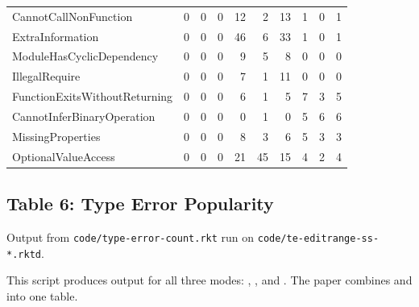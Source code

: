 \documentclass{article}
\begin{document}
\begin{tabular}{lr@{~}r@{~}rr@{~}r@{~}rr@{~}r@{~}r}
  CannotCallNonFunction & {0} & {0} & {0} & {12} & {2} & {13} & {1} & {0} & {1} \\
  ExtraInformation & {0} & {0} & {0} & {46} & {6} & {33} & {1} & {0} & {1} \\
  ModuleHasCyclicDependency & {0} & {0} & {0} & {9} & {5} & {8} & {0} & {0} & {0} \\
  IllegalRequire & {0} & {0} & {0} & {7} & {1} & {11} & {0} & {0} & {0} \\
  FunctionExitsWithoutReturning & {0} & {0} & {0} & {6} & {1} & {5} & {7} & {3} & {5} \\
  CannotInferBinaryOperation & {0} & {0} & {0} & {0} & {1} & {0} & {5} & {6} & {6} \\
  MissingProperties & {0} & {0} & {0} & {8} & {3} & {6} & {5} & {3} & {3} \\
  OptionalValueAccess & {0} & {0} & {0} & {21} & {45} & {15} & {4} & {2} & {4} \\
\end{tabular}


\subsection*{Table 6: Type Error Popularity}

Output from \texttt{code/type-error-count.rkt}
run on \texttt{code/te-editrange-ss-*.rktd}.

This script produces output for all three modes: \mnocheck{}, \mnonstrict{}, and \mstrict{}.
The paper combines \mnonstrict{} and \mstrict{} into one table.

\subsubsection*{\mnocheck{}}
\end{document}
